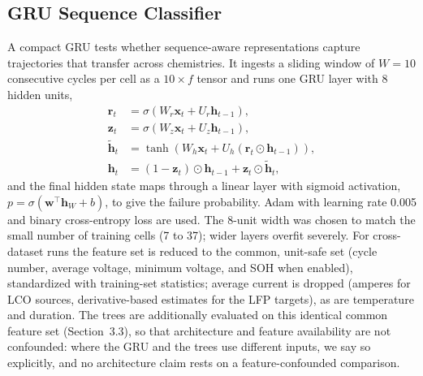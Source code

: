 \documentclass[IJPHM, 2014, 00]{PHMSociety}
\begin{document}
\subsection{GRU Sequence Classifier}
A compact GRU tests whether sequence-aware representations capture trajectories that transfer across chemistries. It ingests a sliding window of $W{=}10$ consecutive cycles per cell as a $10{\times}f$ tensor and runs one GRU layer with 8 hidden units,
\begin{equation}\label{eq:gru}
\begin{aligned}
\mathbf{r}_t &= \sigma(W_r\mathbf{x}_t + U_r\mathbf{h}_{t-1}),\\[2pt]
\mathbf{z}_t &= \sigma(W_z\mathbf{x}_t + U_z\mathbf{h}_{t-1}),\\[2pt]
\tilde{\mathbf{h}}_t &= \tanh(W_h\mathbf{x}_t + U_h(\mathbf{r}_t\odot\mathbf{h}_{t-1})),\\[2pt]
\mathbf{h}_t &= (1-\mathbf{z}_t)\odot\mathbf{h}_{t-1} + \mathbf{z}_t\odot\tilde{\mathbf{h}}_t,
\end{aligned}
\end{equation}
and the final hidden state maps through a linear layer with sigmoid activation, $p=\sigma(\mathbf{w}^{\top}\mathbf{h}_W + b)$, to give the failure probability. Adam with learning rate 0.005 and binary cross-entropy loss are used. The 8-unit width was chosen to match the small number of training cells (7 to 37); wider layers overfit severely. For cross-dataset runs the feature set is reduced to the common, unit-safe set (cycle number, average voltage, minimum voltage, and SOH when enabled), standardized with training-set statistics; average current is dropped (amperes for LCO sources, derivative-based estimates for the LFP targets), as are temperature and duration. The trees are additionally evaluated on this identical common feature set (Section~3.3), so that architecture and feature availability are not confounded: where the GRU and the trees use different inputs, we say so explicitly, and no architecture claim rests on a feature-confounded comparison.
\end{document}

